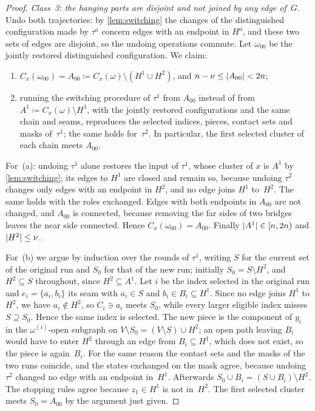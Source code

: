 \begin{proof}
\emph{Class~3: the hanging parts are disjoint and not joined by any edge of~$G$.} Undo both
trajectories: by \cref{lem:switching} the changes of the distinguished configuration made by $\tau^a$
concern edges with an endpoint in $H^a$, and these two sets of edges are disjoint, so the undoing
operations commute. Let $\omega_{00}$ be the jointly restored distinguished configuration. We claim:
\begin{enumerate}[label=(\alph*)]
  \item $C_x(\omega_{00})=A_{00}\coloneqq C_x(\omega)\setminus(H^1\cup H^2)$, and
  $n-\nu\le\lvert A_{00}\rvert<2n$;
  \item running the switching procedure of $\tau^1$ from $A_{00}$ instead of from
  $A^1\coloneqq C_x(\omega)\setminus H^1$, with the jointly restored configurations and the same chain
  and seams, reproduces the selected indices, pieces, contact sets and masks of~$\tau^1$; the same
  holds for~$\tau^2$. In particular, the first selected cluster of each chain meets $A_{00}$.
\end{enumerate}
For~(a): undoing $\tau^1$ alone restores the input of $\tau^1$, whose cluster of $x$ is $A^1$ by
\cref{lem:switching}; its edges to $H^1$ are closed and remain so, because undoing $\tau^2$ changes only
edges with an endpoint in $H^2$, and no edge joins $H^1$ to~$H^2$. The same holds with the roles
exchanged. Edges with both endpoints in $A_{00}$ are not changed, and $A_{00}$ is connected, because
removing the far sides of two bridges leaves the near side connected. Hence $C_x(\omega_{00})=A_{00}$.
Finally $\lvert A^1\rvert\in[n,2n)$ and $\lvert H^2\rvert\le\nu$.

For~(b) we argue by induction over the rounds of $\tau^1$, writing $S$ for the current set of the
original run and $S_0$ for that of the new run; initially $S_0=S\setminus H^2$, and $H^2\subseteq S$
throughout, since $H^2\subseteq A^1$. Let $i$ be the index selected in the original run and
$e_i=\{a_i,b_i\}$ its seam with $a_i\in S$ and $b_i\in B_i\subseteq H^1$. Since no edge joins $H^1$ to
$H^2$, we have $a_i\notin H^2$, so $C_i\ni a_i$ meets $S_0$, while every larger eligible index misses
$S\supseteq S_0$. Hence the same index is selected. The new piece is the component of $y_i$ in the
$\omega^{(i)}$-open subgraph on $V\setminus S_0=(V\setminus S)\cup H^2$; an open path leaving $B_i$
would have to enter $H^2$ through an edge from $B_i\subseteq H^1$, which does not exist, so the piece is
again~$B_i$. For the same reason the contact sets and the masks of the two runs coincide, and the states
exchanged on the mask agree, because undoing $\tau^2$ changed no edge with an endpoint in~$H^1$.
Afterwards $S_0\cup B_i=(S\cup B_i)\setminus H^2$. The stopping rules agree because $z_1\in H^1$ is not
in~$H^2$. The first selected cluster meets $S_0=A_{00}$ by the argument just given.


\end{proof}

